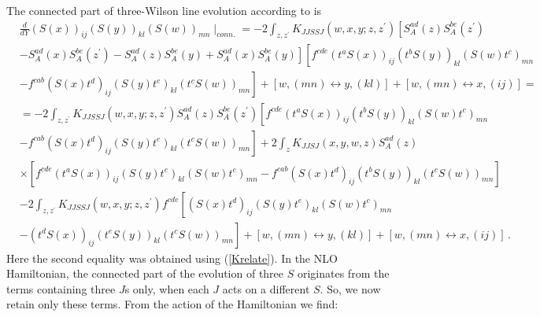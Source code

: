 \documentclass[11pt,a4paper]{article}
\begin{document}
The connected part of three-Wilson line evolution according to \cite{BClast} is
\begin{equation}\begin{split}\label{triple}
&\frac{d}{dY}(S(x))_{ij}(S(y))_{kl}(S(w))_{mn}\mid_{conn.}=-2\int_{z,z^{\prime}}K_{JJSSJ}(w,x,y;z,z^{\prime})\left[S_{A}^{ad}(z)S_{A}^{be}(z^{\prime})\right. \\
&\left. -S_{A}^{ad}(x)S_{A}^{be}(z^{\prime})-S_{A}^{ad}(z)S_{A}^{be}(y)+S_{A}^{ad}(x)S_{A}^{be}(y)\right] \left[f^{cde}(t^{a}S(x))_{ij}(t^{b}S(y))_{kl}(S(w)t^{c})_{mn}\right. \\
&\left. -f^{cab}(S(x)t^{d})_{ij}(S(y)t^{e})_{kl}(t^{c}S(w))_{mn}\right]+\left[w,(mn)\leftrightarrow y,(kl)\right]+\left[w,(mn)\leftrightarrow x,(ij)\right]=\\
&=-2\int_{z,z^{\prime}}K_{JJSSJ}(w,x,y;z,z^{\prime})S_{A}^{ad}(z)S_{A}^{be}(z^{\prime})\left[f^{cde}(t^{a}S(x))_{ij}(t^{b}S(y))_{kl}(S(w)t^{c})_{mn}\right. \\
&\left.-f^{cab}(S(x)t^{d})_{ij}(S(y)t^{e})_{kl}(t^{c}S(w))_{mn}\right]+2\int_{z}K_{JJSJ}(x,y,w,z)S_{A}^{ad}(z)\\
&\times \left[f^{cde}(t^{a}S(x))_{ij}(S(y)t^{e})_{kl}(S(w)t^{c})_{mn}-f^{cab}(S(x)t^{d})_{ij}(t^{b}S(y))_{kl}(t^{c}S(w))_{mn}\right]\\
&-2\int_{z,z^{\prime}}K_{JJSSJ}(w,x,y;z,z^{\prime})f^{cde}\left[(S(x)t^{d})_{ij}(S(y)t^{e})_{kl}(S(w)t^{c})_{mn}\right. \\
&\left. -(t^{d}S(x))_{ij}(t^{e}S(y))_{kl}(t^{c}S(w))_{mn}\right]
+\left[w,(mn)\leftrightarrow y,(kl)\right]+\left[w,(mn)\leftrightarrow x,(ij)\right]\,.
\end{split}\end{equation}
Here the second equality was obtained using (\ref{Krelate}).
In the NLO  Hamiltonian, the connected part of the evolution of three $S$ originates from the terms containing three $J$s only, when each $J$ acts 
on a different $S$. So, we now retain only these terms. From the action of the Hamiltonian we find:
\end{document}
